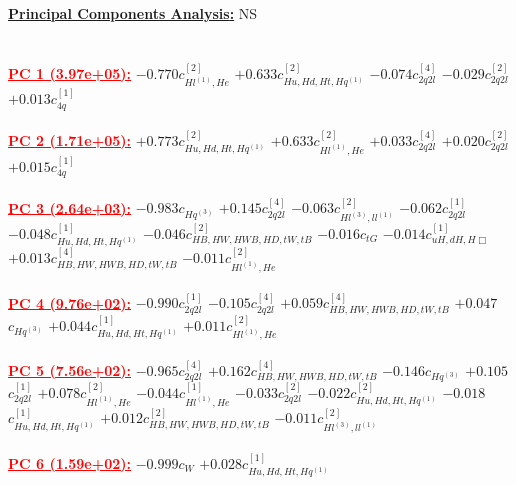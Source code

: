 \documentclass{article}
\begin{document}
\noindent \underline{\bf{Principal Components Analysis}:} NS\\ \\ \\
\noindent \textcolor{red}{\underline{\bf{PC 1} (3.97e+05):}}
{$-0.770$}{\rm $c_{Hl^{(1)},He}^{[2]}$} 
{$+0.633$}{\rm $c_{Hu,Hd,Ht,Hq^{(1)}}^{[2]}$} 
{$-0.074$}{\rm $c_{2q2l}^{[4]}$} 
{$-0.029$}{\rm $c_{2q2l}^{[2]}$} 
{$+0.013$}{\rm $c_{4q}^{[1]}$} 
 \nonumber \\ \nonumber \\ 
\noindent \textcolor{red}{\underline{\bf{PC 2} (1.71e+05):}}
{$+0.773$}{\rm $c_{Hu,Hd,Ht,Hq^{(1)}}^{[2]}$} 
{$+0.633$}{\rm $c_{Hl^{(1)},He}^{[2]}$} 
{$+0.033$}{\rm $c_{2q2l}^{[4]}$} 
{$+0.020$}{\rm $c_{2q2l}^{[2]}$} 
{$+0.015$}{\rm $c_{4q}^{[1]}$} 
 \nonumber \\ \nonumber \\ 
\noindent \textcolor{red}{\underline{\bf{PC 3} (2.64e+03):}}
{$-0.983$}{\rm $c_{Hq^(3)}$} 
{$+0.145$}{\rm $c_{2q2l}^{[4]}$} 
{$-0.063$}{\rm $c_{Hl^{(3)},ll^{(1)}}^{[2]}$} 
{$-0.062$}{\rm $c_{2q2l}^{[1]}$} 
{$-0.048$}{\rm $c_{Hu,Hd,Ht,Hq^{(1)}}^{[1]}$} 
{$-0.046$}{\rm $c_{HB,HW,HWB,HD,tW,tB}^{[2]}$} 
{$-0.016$}{\rm $c_{tG}$} 
{$-0.014$}{\rm $c_{uH,dH,H\Box}^{[1]}$} 
{$+0.013$}{\rm $c_{HB,HW,HWB,HD,tW,tB}^{[4]}$} 
{$-0.011$}{\rm $c_{Hl^{(1)},He}^{[2]}$} 
 \nonumber \\ \nonumber \\ 
\noindent \textcolor{red}{\underline{\bf{PC 4} (9.76e+02):}}
{$-0.990$}{\rm $c_{2q2l}^{[1]}$} 
{$-0.105$}{\rm $c_{2q2l}^{[4]}$} 
{$+0.059$}{\rm $c_{HB,HW,HWB,HD,tW,tB}^{[4]}$} 
{$+0.047$}{\rm $c_{Hq^(3)}$} 
{$+0.044$}{\rm $c_{Hu,Hd,Ht,Hq^{(1)}}^{[1]}$} 
{$+0.011$}{\rm $c_{Hl^{(1)},He}^{[2]}$} 
 \nonumber \\ \nonumber \\ 
\noindent \textcolor{red}{\underline{\bf{PC 5} (7.56e+02):}}
{$-0.965$}{\rm $c_{2q2l}^{[4]}$} 
{$+0.162$}{\rm $c_{HB,HW,HWB,HD,tW,tB}^{[4]}$} 
{$-0.146$}{\rm $c_{Hq^(3)}$} 
{$+0.105$}{\rm $c_{2q2l}^{[1]}$} 
{$+0.078$}{\rm $c_{Hl^{(1)},He}^{[2]}$} 
{$-0.044$}{\rm $c_{Hl^{(1)},He}^{[1]}$} 
{$-0.033$}{\rm $c_{2q2l}^{[2]}$} 
{$-0.022$}{\rm $c_{Hu,Hd,Ht,Hq^{(1)}}^{[2]}$} 
{$-0.018$}{\rm $c_{Hu,Hd,Ht,Hq^{(1)}}^{[1]}$} 
{$+0.012$}{\rm $c_{HB,HW,HWB,HD,tW,tB}^{[2]}$} 
{$-0.011$}{\rm $c_{Hl^{(3)},ll^{(1)}}^{[2]}$} 
 \nonumber \\ \nonumber \\ 
\noindent \textcolor{red}{\underline{\bf{PC 6} (1.59e+02):}}
{$-0.999$}{\rm $c_{W}$} 
{$+0.028$}{\rm $c_{Hu,Hd,Ht,Hq^{(1)}}^{[1]}$} 
\end{document}
